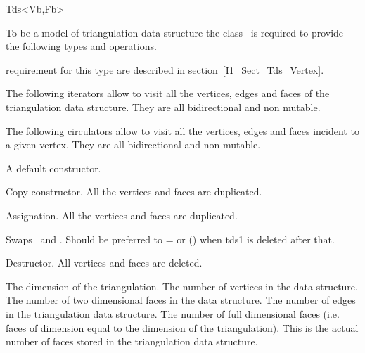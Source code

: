 \begin{ccClassTemplate}{Tds<Vb,Fb>}

To be a model of  triangulation data structure 
the class \ccClassTemplateName\
is required to  provide the
following types and operations.

\ccGlue
{}
\ccThreeToTwo
{}
\ccGlue
{}
\ccGlue
{} { requirement for this type are described in  section~\ref{I1_Sect_Tds_Vertex}.}
\ccGlue
{}

The following iterators allow to visit all the vertices, edges and faces
of the triangulation data structure. They are all bidirectional and non mutable.

\ccGlue
{}
\ccGlue
{}

The following circulators allow to visit all the vertices, edges and faces
incident to a given vertex. They are all bidirectional and non mutable.

\ccGlue
{}
\ccGlue
{}
  
\ccCreation
{}
{A default constructor.}

{Copy constructor. All the vertices and faces are duplicated.}

{Assignation. All the vertices and faces are duplicated.}

{Swaps \ccVar\ and . Should be preferred to \ccVar= or \ccVar()
when tds1 is deleted after that.}

{Destructor. All vertices and faces are deleted.}

\ccAccessFunctions
{}
{The dimension of the triangulation.}
\ccGlue
{}
{The number of vertices in the data structure.}
\ccGlue
{}
{The number of two dimensional faces in the data structure.}
\ccGlue
{}
{The number of edges  in the triangulation data structure.}
\ccGlue
{}
{The number of full dimensional faces 
(i.e. faces of dimension equal to the dimension
of the triangulation). This is the actual
number of faces stored in the triangulation data structure.}


\end{ccClassTemplate}
